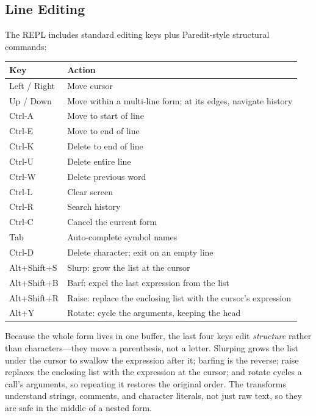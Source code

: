 \subsection{Line Editing}

The REPL includes standard editing keys plus Paredit-style structural commands:

\begin{center}
\begin{tabular}{ll}
\textbf{Key} & \textbf{Action} \\
\hline
Left / Right & Move cursor \\
Up / Down & Move within a multi-line form; at its edges, navigate history \\
Ctrl-A & Move to start of line \\
Ctrl-E & Move to end of line \\
Ctrl-K & Delete to end of line \\
Ctrl-U & Delete entire line \\
Ctrl-W & Delete previous word \\
Ctrl-L & Clear screen \\
Ctrl-R & Search history \\
Ctrl-C & Cancel the current form \\
Tab & Auto-complete symbol names \\
Ctrl-D & Delete character; exit on an empty line \\
Alt+Shift+S & Slurp: grow the list at the cursor \\
Alt+Shift+B & Barf: expel the last expression from the list \\
Alt+Shift+R & Raise: replace the enclosing list with the cursor's expression \\
Alt+Y & Rotate: cycle the arguments, keeping the head \\
\end{tabular}
\end{center}

Because the whole form lives in one buffer, the last four keys edit \emph{structure} rather than characters---they move a parenthesis, not a letter. Slurping grows the list under the cursor to swallow the expression after it; barfing is the reverse; raise replaces the enclosing list with the expression at the cursor; and rotate cycles a call's arguments, so repeating it restores the original order. The transforms understand strings, comments, and character literals, not just raw text, so they are safe in the middle of a nested form.

